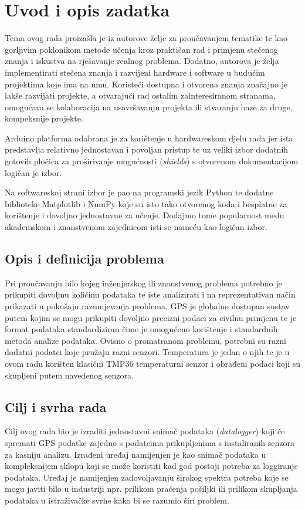 \chapter{Uvod i opis zadatka}\label{OpisIOgranicenja}
Tema ovog rada proizašla je iz autorove želje za proučavanjem tematike te kao gorljivim poklonikom metode učenja kroz praktičan rad i primjenu stečenog znanja i iskustva na rješavanje realnog problema.
Dodatno, autorova je želja implementirati stečena znanja i razvijeni hardware i software u budućim projektima koje ima na umu.
Koristeći dostupna i otvorena znanja značajno je lakše razvijati projekte, a otvarajući rad ostalim zainteresiranom stranama, omogućava se kolaboracija na usavršavanju projekta ili stvaranju baze za druge, kompeksnije projekte.

Arduino platforma odabrana je za korištenje u hardwareskom djelu rada jer ista predstavlja relativno jednostavan i povoljan pristup te uz veliki izbor dodatnih gotovih pločica za proširivanje mogućnosti (\textit{shields}) s otvorenom dokumentacijom logičan je izbor.

Na softwareskoj strani izbor je pao na programski jezik Python te dodatne biblioteke Matplotlib i NumPy koje su isto tako otvorenog koda i besplatne za korištenje i dovoljno jednostavne za učenje.
Dodajmo tome popularnost među akademskom i znanstvenom zajednicom isti se nameću kao logičan izbor.

\section{Opis i definicija problema}
Pri proučavanju bilo kojeg inženjerskog ili znanstvenog problema potrebno je prikupiti dovoljnu količinu podataka te iste analizirati i na reprezentativan način prikazati u pokušaju razumjevanja problema.
GPS je globalno dostupan sustav putem kojim se mogu prikupiti dovoljno precizni podaci za civilnu primjenu te je format podataka standardiziran čime je omogućeno korištenje i standardnih metoda analize podataka.
Ovisno o promatranom problemu, potrebni su razni dodatni podatci koje pružaju razni senzori.
Temperatura je jedan o njih te je u ovom radu korišten klasični TMP36 temperaturni senzor i obrađeni podaci koji su skupljeni putem navedenog senzora.

\section{Cilj i svrha rada}
Cilj ovog rada bio je izraditi jednostavni snimač podataka (\textit{datalogger}) koji će spremati GPS podatke zajedno s podatcima prikupljenima s instaliranih senzora za kasniju analizu.
Izrađeni uređaj namijenjen je kao snimač podataka u kompleksnijem sklopu koji se može koristiti kad god postoji potreba za loggiranje podataka.
Uređaj je namijenjen zadovoljavanju širokog spektra potreba koje se mogu javiti bilo u industriji npr. prilikom praćenja pošiljki ili prilikom skupljanja podataka u istraživačke svrhe kako bi se razumio širi problem.

